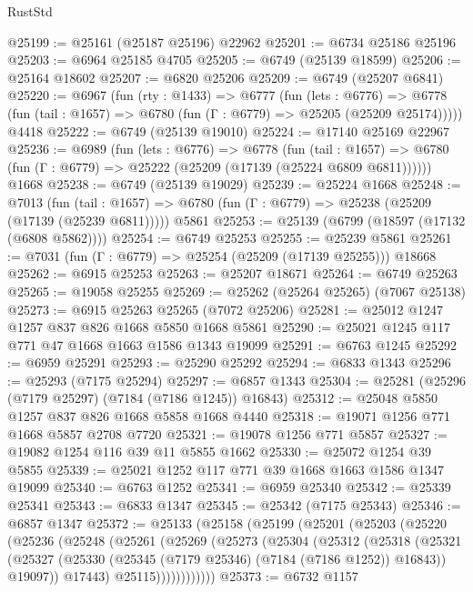 \begin{lexlean}{RustStd}
\begin{coremodule}
@25199 := @25161 (@25187 @25196) @22962
@25201 := @6734 @25186 @25196
@25203 := @6964 @25185 @4705
@25205 := @6749 (@25139 @18599)
@25206 := @25164 @18602
@25207 := @6820 @25206
@25209 := @6749 (@25207 @6841)
@25220 := @6967
    (fun (rty : @1433) =>
    @6777
      (fun (lets : @6776) =>
      @6778 (fun (tail : @1657) => @6780 (fun (Γ : @6779) => @25205 (@25209 @25174)))))
    @4418
@25222 := @6749 (@25139 @19010)
@25224 := @17140 @25169 @22967
@25236 := @6989
    (fun (lets : @6776) =>
    @6778
      (fun (tail : @1657) =>
      @6780 (fun (Γ : @6779) => @25222 (@25209 (@17139 (@25224 @6809 @6811))))))
    @1668
@25238 := @6749 (@25139 @19029)
@25239 := @25224 @1668
@25248 := @7013
    (fun (tail : @1657) => @6780 (fun (Γ : @6779) => @25238 (@25209 (@17139 (@25239 @6811)))))
    @5861
@25253 := @25139 (@6799 (@18597 (@17132 (@6808 @5862))))
@25254 := @6749 @25253
@25255 := @25239 @5861
@25261 := @7031 (fun (Γ : @6779) => @25254 (@25209 (@17139 @25255))) @18668
@25262 := @6915 @25253
@25263 := @25207 @18671
@25264 := @6749 @25263
@25265 := @19058 @25255
@25269 := @25262 (@25264 @25265) (@7067 @25138)
@25273 := @6915 @25263 @25265 (@7072 @25206)
@25281 := @25012 @1247 @1257 @837 @826 @1668 @5850 @1668 @5861
@25290 := @25021 @1245 @117 @771 @47 @1668 @1663 @1586 @1343 @19099
@25291 := @6763 @1245
@25292 := @6959 @25291
@25293 := @25290 @25292
@25294 := @6833 @1343
@25296 := @25293 (@7175 @25294)
@25297 := @6857 @1343
@25304 := @25281 (@25296 (@7179 @25297) (@7184 (@7186 @1245)) @16843)
@25312 := @25048 @5850 @1257 @837 @826 @1668 @5858 @1668 @4440
@25318 := @19071 @1256 @771 @1668 @5857 @2708 @7720
@25321 := @19078 @1256 @771 @5857
@25327 := @19082 @1254 @116 @39 @11 @5855 @1662
@25330 := @25072 @1254 @39 @5855
@25339 := @25021 @1252 @117 @771 @39 @1668 @1663 @1586 @1347 @19099
@25340 := @6763 @1252
@25341 := @6959 @25340
@25342 := @25339 @25341
@25343 := @6833 @1347
@25345 := @25342 (@7175 @25343)
@25346 := @6857 @1347
@25372 := @25133
    (@25158
      (@25199
        (@25201
          (@25203
            (@25220
              (@25236
                (@25248
                  (@25261
                    (@25269
                      (@25273
                        (@25304
                          (@25312
                            (@25318
                              (@25321
                                (@25327
                                  (@25330 (@25345 (@7179 @25346) (@7184 (@7186 @1252)) @16843))
                                  @19097))
                              @17443)
                            @25115))))))))))))
@25373 := @6732 @1157

\end{coremodule}
\end{lexlean}
